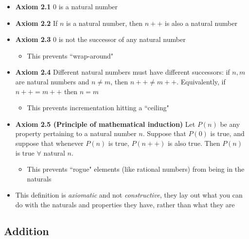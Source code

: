 \documentclass[11pt]{article}
\begin{document}
\begin{itemize}
  \item \textbf{Axiom 2.1} 0 is a natural number
  \item \textbf{Axiom 2.2} If $n$ is a natural number, then $n++$ is also a natural number
  \item \textbf{Axiom 2.3} 0 is not the successor of any natural number
  \begin{itemize}
    \item This prevents ``wrap-around"
  \end{itemize}
  \item \textbf{Axiom 2.4} Different natural numbers must have different successors: if $n, m$ are natural numbers and $n \neq m$, then $n++ \neq m++$. Equivalently, if $n++ = m++$ then $n = m$
    \begin{itemize}
      \item This prevents incrementation hitting a ``ceiling"
    \end{itemize}
  \item \textbf{Axiom 2.5 (Principle of mathematical induction)} Let $P(n)$ be any property pertaining to a natural number $n$. Suppose that $P(0)$ is true, and suppose that whenever $P(n)$ is true, $P(n++)$ is also true. Then $P(n)$ is true $\forall$ natural $n$.
  \begin{itemize}
    \item This prevents ``rogue" elements (like rational numbers) from being in the naturals
  \end{itemize}
  \item This definition is \textit{axiomatic} and not \textit{constructive}, they lay out what you can do with the naturals and properties they have, rather than what they are
\end{itemize}

\subsection{Addition}
\end{document}
